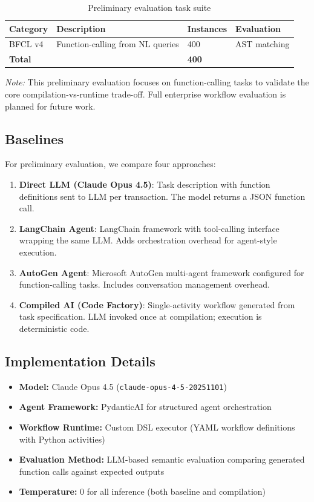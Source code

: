\documentclass[11pt]{article}
\begin{document}
\begin{table}[ht]
\centering
\caption{Preliminary evaluation task suite}
\label{tab:tasks}
\begin{tabular}{p{3.5cm}p{4cm}p{2cm}p{2.5cm}}
\toprule
Category & Description & Instances & Evaluation \\
\midrule
BFCL v4 & Function-calling from NL queries & 400 & AST matching \\
\midrule
\textbf{Total} & & \textbf{400} & \\
\bottomrule
\end{tabular}
\end{table}

\noindent\textit{Note:} This preliminary evaluation focuses on function-calling tasks to validate the core compilation-vs-runtime trade-off. Full enterprise workflow evaluation is planned for future work.

\subsection{Baselines}

For preliminary evaluation, we compare four approaches:

\begin{enumerate}
    \item \textbf{Direct LLM (Claude Opus 4.5)}: Task description with function definitions sent to LLM per transaction. The model returns a JSON function call.
    \item \textbf{LangChain Agent}: LangChain framework with tool-calling interface wrapping the same LLM. Adds orchestration overhead for agent-style execution.
    \item \textbf{AutoGen Agent}: Microsoft AutoGen multi-agent framework configured for function-calling tasks. Includes conversation management overhead.
    \item \textbf{Compiled AI (Code Factory)}: Single-activity workflow generated from task specification. LLM invoked once at compilation; execution is deterministic code.
\end{enumerate}

\subsection{Implementation Details}

\begin{itemize}
    \item \textbf{Model:} Claude Opus 4.5 (\texttt{claude-opus-4-5-20251101})
    \item \textbf{Agent Framework:} PydanticAI for structured agent orchestration
    \item \textbf{Workflow Runtime:} Custom DSL executor (YAML workflow definitions with Python activities)
    \item \textbf{Evaluation Method:} LLM-based semantic evaluation comparing generated function calls against expected outputs
    \item \textbf{Temperature:} 0 for all inference (both baseline and compilation)
\end{itemize}
\end{document}
